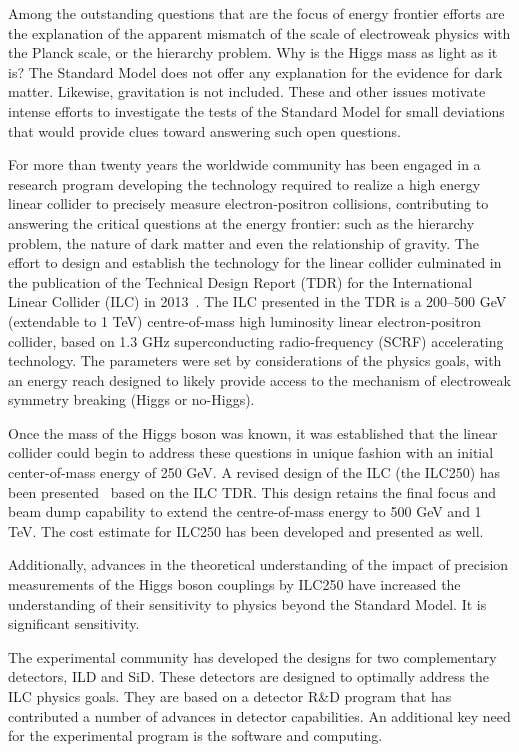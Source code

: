\documentclass[%
 reprint,
 amsmath,amssymb,
 aps,
]{revtex4-1}
\begin{document}
Among the outstanding questions that are the focus of energy frontier
efforts are the explanation of the apparent mismatch of the scale of
electroweak physics with the Planck scale, or the hierarchy problem.
Why is the Higgs mass as light as it is?
The Standard Model does not offer any explanation for the evidence for dark matter.
Likewise, gravitation is not included.  These and other issues
motivate intense efforts to investigate the tests of the Standard Model
for small deviations that would provide clues toward answering such
open questions.

For more than twenty years the worldwide community has been engaged in a research
program developing the technology required to realize a high energy linear collider
to precisely measure electron-positron collisions, contributing to 
answering the critical questions at the energy frontier: such as the hierarchy problem,
the nature of dark matter and even the relationship of gravity.
The effort to design and establish the technology for the linear collider 
culminated in the publication of the Technical Design Report (TDR)
for the International Linear Collider (ILC) in 2013~\cite{Behnke:2013xla}.
The ILC presented in the TDR is a 200–500 GeV (extendable to 1 TeV) centre-of-mass 
high luminosity
linear electron-positron collider, based on 1.3 GHz superconducting radio-frequency (SCRF)
accelerating technology. 
The parameters were set by considerations of the physics goals,
with an energy reach designed to likely provide access to the mechanism of 
electroweak symmetry breaking (Higgs or no-Higgs).

Once the mass of the Higgs boson was known, it was established that the
linear collider could begin to address these questions in unique fashion
with an initial center-of-mass energy of 250 GeV.
A revised design of the ILC (the ILC250) has been presented~\cite{Evans:2017rvt}
based on the ILC TDR.  This design retains the final focus and beam dump
 capability to extend the
centre-of-mass energy to 500 GeV and 1 TeV.  The cost estimate for ILC250 has 
been developed and presented as well.

Additionally, advances in the theoretical understanding of the impact of precision
measurements of the Higgs boson couplings by ILC250 have increased the understanding
of their sensitivity to physics beyond the Standard Model.  It is significant sensitivity.

The experimental community has developed the designs for two complementary detectors,
ILD and SiD.  These detectors are designed to optimally address the
ILC physics goals.  They are based on a detector R\&D program that has
contributed a number of advances in detector capabilities.
An additional key need for the experimental program is the software and computing.
\end{document}
